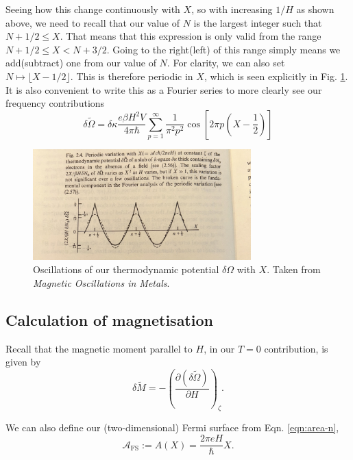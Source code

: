 \documentclass[12pt]{revtex4-2}
\begin{document}
Seeing how this change continuously with $X$, so with increasing $1/H$ as shown above, we need to recall that our value of $N$ is the largest integer such that $N + 1/2 \leq X$.  That means that this expression is only valid from the range $N + 1/2 \leq X < N + 3/2$.  Going to the right(left) of this range simply means we add(subtract) one from our value of $N$.  For clarity, we can also set $N \mapsto \lfloor X-1/2 \rfloor$.  This is therefore periodic in $X$, which is seen explicitly in Fig. \ref{fig:oscillations-energy}.  It is also convenient to write this as a Fourier series to more clearly see our frequency contributions
\begin{equation}
    \boxed{\delta\tilde{\Omega} = \delta \kappa \frac{e\beta H^2V}{4\pi\hbar} \sum_{p=1}^\infty \frac{1}{\pi^2 p^2}\cos\left[ 2\pi p\left( X - \frac{1}{2} \right) \right]}
\end{equation}

\begin{figure}[tb]
\centering
\includegraphics[width=0.75\textwidth]{figures/oscillations_free_energy.jpg}
\caption{Oscillations of our thermodynamic potential $\delta\Omega$ with $X$.  Taken from \textit{Magnetic Oscillations in Metals}.}
\label{fig:oscillations-energy}
\end{figure}

\subsection{Calculation of magnetisation}

Recall that the magnetic moment parallel to $H$, in our $T=0$ contribution, is given by
\begin{equation}
    \delta \tilde{M} = -\left( \frac{\partial(\delta\tilde{\Omega})}{\partial H} \right)_\zeta.
\end{equation}

We can also define our (two-dimensional) Fermi surface from Eqn. \ref{eqn:area-n}, 
\begin{equation}\label{eqn:fermi-surface-area}
    \mathcal{A}_\text{FS} := A(X) = \frac{2\pi eH}{\hbar}X.
\end{equation}
\end{document}
